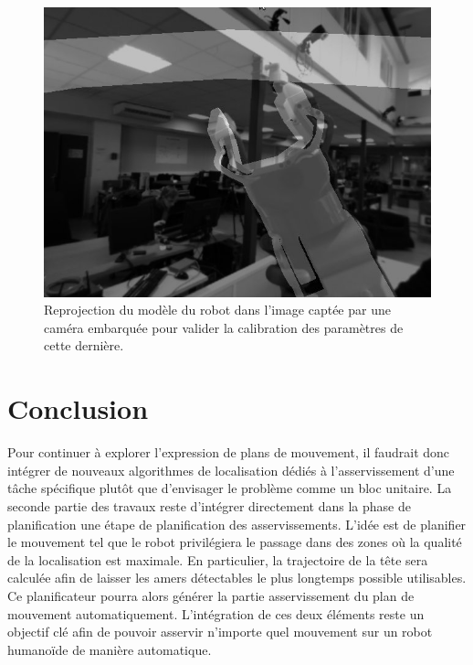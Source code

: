 \begin{figure}
  \begin{center}
    \includegraphics[width=.95\linewidth]{src/chap3-primitive-mouvement/calibextrinsic.jpg}
  \end{center}
  \caption{Reprojection du modèle du robot dans l'image captée par une
    caméra embarquée pour valider la calibration des paramètres de
    cette dernière. \label{fig:reprojection_modele_vision}}
\end{figure}


\section{Conclusion}

Pour continuer à explorer l'expression de plans de mouvement, il
faudrait donc intégrer de nouveaux algorithmes de localisation dédiés
à l'asservissement d'une tâche spécifique plutôt que d'envisager le
problème comme un bloc unitaire. La seconde partie des travaux reste
d'intégrer directement dans la phase de planification une étape de
planification des asservissements. L'idée est de planifier le
mouvement tel que le robot privilégiera le passage dans des zones où
la qualité de la localisation est maximale. En particulier, la
trajectoire de la tête sera calculée afin de laisser les amers
détectables le plus longtemps possible utilisables. Ce planificateur
pourra alors générer la partie asservissement du plan de mouvement
automatiquement. L'intégration de ces deux éléments reste un objectif
clé afin de pouvoir asservir n'importe quel mouvement sur un robot
humanoïde de manière automatique.

